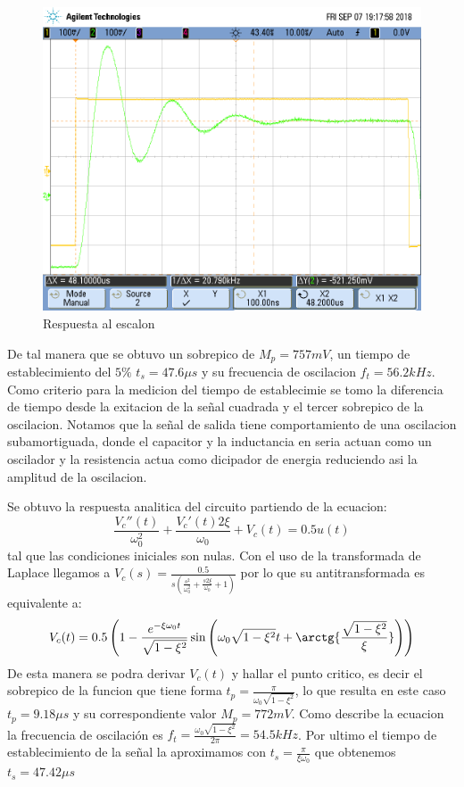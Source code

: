 \begin{figure}[h!]
\centering
\includegraphics[scale=0.25]{LRC2a.png}
\caption{Respuesta al escalon}
\label{fig:LRC2}
\end{figure}

De tal manera que se obtuvo un sobrepico de $M_p = 757mV$, un tiempo de establecimiento del $5\%$ $t_s = 47.6{\mu}s$ y su frecuencia de oscilacion $f_t = 56.2kHz$. Como criterio para la medicion del tiempo de establecimie se tomo la diferencia de tiempo desde la exitacion de la señal cuadrada y el tercer sobrepico de la oscilacion. Notamos que la señal de salida tiene comportamiento de una oscilacion subamortiguada, donde el capacitor y la inductancia en seria actuan como un oscilador y la resistencia actua como dicipador de energia reduciendo asi la amplitud de la oscilacion.

Se obtuvo la respuesta analitica del circuito partiendo de la ecuacion: $$\frac{V_c''(t)}{\omega_0^2} + \frac{V_c'(t) 2\xi}{\omega_0} + V_c(t) =  0.5u(t)$$ tal que las condiciones iniciales son nulas. Con el uso de la transformada de Laplace llegamos a $V_c(s) = \frac{0.5}{s(\frac{s^2}{\omega_0^2}+\frac{s2\xi}{\omega_0}+1)}$ por lo que su antitransformada es equivalente a:$$V_c(t) = 0.5\left(1-\frac{e^{-\xi\omega_0t}}{\sqrt{1-\xi^2}}\sin{\left(\omega_0\sqrt{1-\xi^2}t+\arctg{\frac{\sqrt{{1-\xi^2}}}{\xi}}\right)}\right)$$ 
De esta manera se podra derivar $V_c(t)$ y hallar el punto critico, es decir el sobrepico de la funcion que tiene forma $t_p=\frac{\pi}{\omega_0\sqrt{1-\xi^2}}$, lo que resulta en este caso $t_p=9.18{\mu}s$ y su correspondiente valor $M_p=772mV$. Como describe la ecuacion la frecuencia de oscilación es $f_t= \frac{\omega_0\sqrt{1-\xi^2}}{2\pi} = 54.5kHz$. Por ultimo el tiempo de establecimiento de la señal la aproximamos con $t_s=\frac{\pi}{\xi\omega_0}$ que obtenemos $t_s = 47.42{\mu}s$

